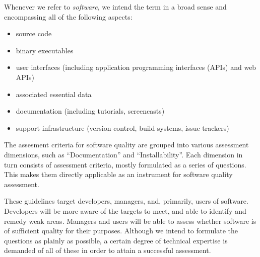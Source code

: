 \documentclass[a4paper,11pt]{article}
\begin{document}
Whenever we refer to \emph{software}, we intend the term in a broad sense and
encompassing all of the following aspects:
\begin{itemize}
    \item source code
    \item binary executables
    \item user interfaces (including application programming interfaces (APIs) and web APIs)
    \item associated essential data
%
%
%
    \item documentation (including tutorials, screencasts)
    \item support infrastructure (version control, build systems, issue trackers)
\end{itemize}

The assesment criteria for software quality are grouped into various assessment
dimensions, such as ``Documentation'' and ``Installability''. Each dimension in turn
consists of assessment criteria, mostly formulated as a series of questions. This
makes them directly applicable as an instrument for software quality
assessment. 

These guidelines target developers, managers, and, primarily, users of software.
Developers will be more aware of the targets to meet, and able to identify and
remedy weak areas. Managers and users will be able to assess whether software
is of sufficient quality for their purposes. Although we intend to
formulate the questions as plainly as possible, a certain degree of technical
expertise is demanded of all of these in order to attain a successful
assessment.
\end{document}
